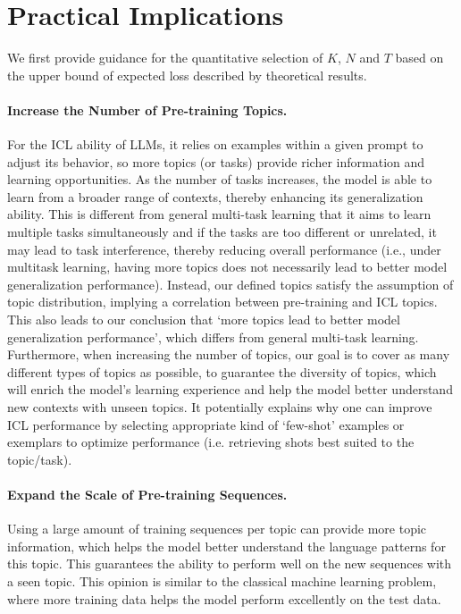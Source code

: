 \newpage
\section{Practical Implications}\label{app:practical}
We first provide guidance for the quantitative selection of $K$, $N$ and $T$ based on the upper bound of expected loss described by theoretical results.

\paragraph{Increase the Number of Pre-training Topics.} For the ICL ability of LLMs, it relies on examples within a given prompt to adjust its behavior, so more topics (or tasks) provide richer information and learning opportunities. As the number of tasks increases, the model is able to learn from a broader range of contexts, thereby enhancing its generalization ability. This is different from general multi-task learning that it aims to learn multiple tasks simultaneously and if the tasks are too different or unrelated, it may lead to task interference, thereby reducing overall performance (i.e., under multitask learning, having more topics does not necessarily lead to better model generalization performance). Instead, our defined topics satisfy the assumption of topic distribution, implying a correlation between pre-training and ICL topics. This also leads to our conclusion that `more topics lead to better model generalization performance', which differs from general multi-task learning. Furthermore, when increasing the number of topics, our goal is to cover as many different types of topics as possible, to guarantee the diversity of topics, which will enrich the model's learning experience and help the model better understand new contexts with unseen topics. It potentially explains why one can improve ICL performance by selecting appropriate kind of `few-shot’ examples or exemplars to optimize performance (i.e. retrieving shots best suited to the topic/task).

\paragraph{Expand the Scale of Pre-training Sequences.} Using a large amount of training sequences per topic can provide more topic information, which helps the model better understand the language patterns for this topic. This guarantees the ability to perform well on the new sequences with a seen topic. This opinion is similar to the classical machine learning problem, where more training data helps the model perform excellently on the test data. 

